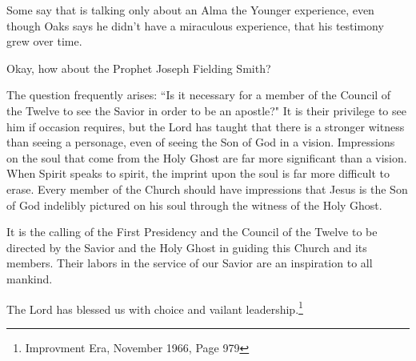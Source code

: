 Some say that is talking only about an Alma the Younger experience, even though Oaks
says he didn't have a miraculous experience, that his testimony grew over time.

Okay, how about the Prophet Joseph Fielding Smith?

\begin{displayquote}
The question frequently arises: ``Is it necessary for a member of the Council of the
Twelve to see the Savior in order to be an apostle?" It is their privilege to see him
if occasion requires, but the Lord has taught that there is a stronger witness than
seeing a personage, even of seeing the Son of God in a vision. Impressions on the
soul that come from the Holy Ghost are far more significant than a vision. When
Spirit speaks to spirit, the imprint upon the soul is far more difficult to erase.
Every member of the Church should have impressions that Jesus is the Son of God
indelibly pictured on his soul through the witness of the Holy Ghost.

It is the calling of the First Presidency and the Council of the Twelve to be
directed by the Savior and the Holy Ghost in guiding this Church and its members.
Their labors in the service of our Savior are an inspiration to all mankind.

The Lord has blessed us with choice and vailant leadership.\footnote{Improvment Era, 
November 1966, Page 979}
\end{displayquote}